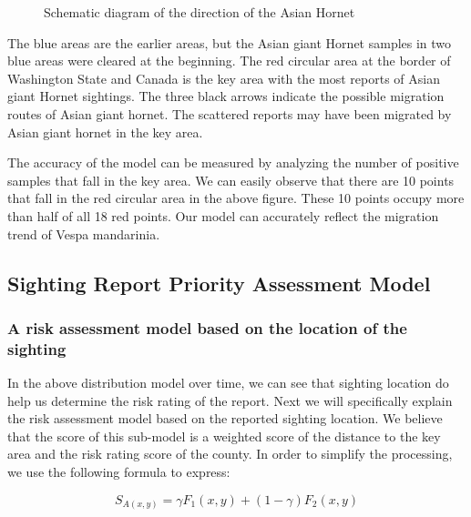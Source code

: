\documentclass{mcmthesis}
\numberwithin{figure}{section}
\numberwithin{table}{section}
\begin{document}
\begin{figure}[H]
  \caption{Schematic diagram of the direction of the Asian Hornet}\label{1_4}
\end{figure}

The blue areas are the earlier areas, but the Asian giant Hornet samples in two blue areas were cleared at the beginning. The red circular area at the border of  Washington State and Canada is the key area with the most reports of Asian giant Hornet sightings. The three black arrows indicate the possible migration routes of Asian giant hornet. The scattered reports may have been migrated by Asian giant hornet in the key area. 

The accuracy of the model can be measured by analyzing the number of positive samples that fall in the key area. We can easily observe that there are 10 points that fall in the red circular area in the above figure. These 10 points occupy more than half of all 18 red points. Our model can accurately reflect the migration trend of Vespa mandarinia.

\subsection{Sighting Report Priority Assessment Model}
\subsubsection{A risk assessment model based on the location of the sighting}
In the above distribution model over time, we can see that sighting location do help us determine the risk rating of the report. Next we will specifically explain the risk assessment model based on the reported sighting location. We believe that the score of this sub-model is a weighted score of the distance to the key area and the risk rating score of the county. In order to simplify the processing, we use the following formula to express:

\begin{equation}
    S_{A(x,y)} = \gamma F_1(x,y)+ (1-\gamma) F_2(x,y)
\end{equation}
\end{document}
